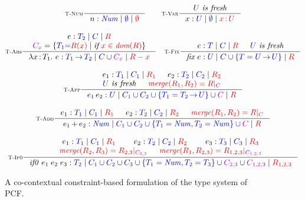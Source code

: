 \begin{figure}[t]
  \centering
  {
  \begin{gather*}
      \inference[\rulename{T-Num}]
        {}
        {\cojudge {n} {\TNum} {\emptyset} {\emptyset}}
\hskip2em
      \inference[\rulename{T-Var}]
        {\fresh{U}}
        {\cojudge {x} {U} {\emptyset} {x \ofType U}}
\\[2ex]
      \inference[\rulename{T-Abs}]
        {\cojudge {e} {T_2} {C} {\reqs} \\
         \typectxcolor{C_x} = \{\typecolor{T_1} \typecolor{=} \ctxcolor{\reqs(x)} \OR \textit{if}\ \ctxcolor{x \in \dom{\reqs}}\}}
        {\cojudge {\abs{x}{T_1}{e}} {T_1 \to T_2} {C \cup \typectxcolor{C_x}} {\reqs - x}}
\hskip1em
      \inference[\rulename{T-Fix}]
        {\cojudge {e} {T} {C} {\reqs} &
         \fresh{U}}
        {\cojudge {\fix{e}} {U} {C \cup \{T = U \to U\}} {\reqs}}
\\[2ex]
      \inference[\rulename{T-App}]
        {\cojudge {e_1} {T_1} {C_1} {\reqs_1} &
         \cojudge {e_2} {T_2} {C_2} {\reqs_2} \\
         \fresh{U} &
         \ctxcolor{\reqmerge{\reqs_1}{\reqs_2} = \reqs|_{\typectxcolor{C}}}}
        {\cojudge {\app{e_1}{e_2}} {U} {C_1 \cup C_2 \cup \{T_1 = T_2 \to U\} \cup \typectxcolor{C}} {\reqs}}
\\[2ex]
      \inference[\rulename{T-Add}]
        {\cojudge {e_1} {T_1} {C_1} {\reqs_1} &
         \cojudge {e_2} {T_2} {C_2} {\reqs_2} &
         \ctxcolor{\reqmerge{\reqs_1}{\reqs_2} = \reqs|_{\typectxcolor{C}}}}
        {\cojudge {\add{e_1}{e_2}} {\TNum} {C_1 \cup C_2 \cup \{T_1 = \TNum, T_2 = \TNum\} \cup \typectxcolor{C}} {\reqs}}
\\[2ex]
      \inference[\rulename{T-If0}]
        {\cojudge {e_1} {T_1} {C_1} {\reqs_1} &
         \cojudge {e_2} {T_2} {C_2} {\reqs_2} &
         \cojudge {e_3} {T_3} {C_3} {\reqs_3} \\
         \ctxcolor{\reqmerge{\reqs_2}{\reqs_3} = \reqs_{2,3}|_{\typectxcolor{C_{2,3}}}} &
         \ctxcolor{\reqmerge{\reqs_1}{\reqs_{2,3}} = \reqs_{1,2,3}|_{\typectxcolor{C_{1,2,3}}}}}
        {\cojudge {\ifzero{e_1}{e_2}{e_3}} {T_2} {C_1 \cup C_2 \cup C_3 \cup \{T_1 = \TNum, T_2 = T_3\} \cup \typectxcolor{C_{2,3}} \cup \typectxcolor{C_{1,2,3}}} {\reqs_{1,2,3}} }
\end{gather*}
}
  \caption{A co-contextual constraint-based formulation of the type system of PCF.}
  \label{fig:co-pcf}
\end{figure}


